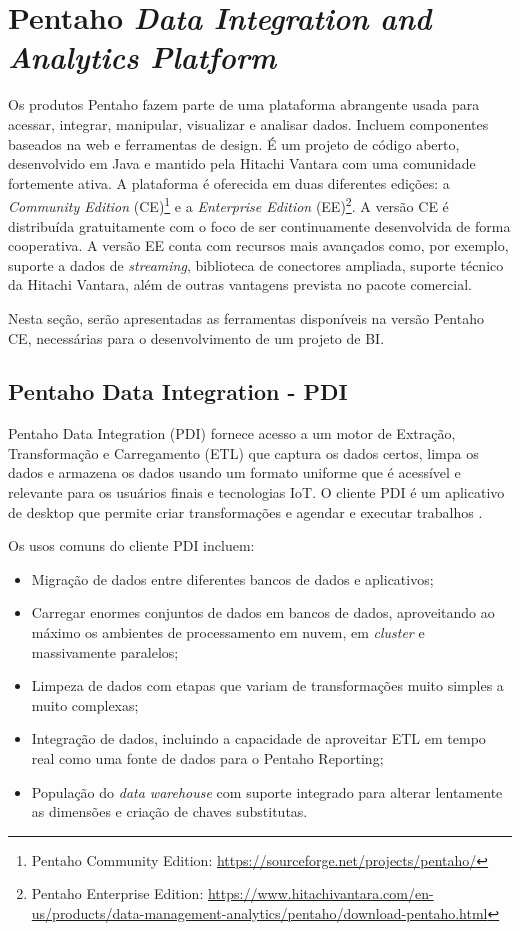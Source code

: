 \section{Pentaho \textit{Data Integration and Analytics Platform}}
Os produtos Pentaho fazem parte de uma plataforma abrangente usada para acessar, integrar, manipular, visualizar e analisar dados. Incluem componentes baseados na web e ferramentas de design. É um projeto de código aberto, desenvolvido em Java e mantido pela Hitachi Vantara com uma comunidade fortemente ativa. A plataforma é oferecida em duas diferentes edições: a \textit{Community Edition} (CE)\footnote{Pentaho Community Edition: \url{https://sourceforge.net/projects/pentaho/}} e a \textit{Enterprise Edition} (EE)\footnote{Pentaho Enterprise Edition: \url{https://www.hitachivantara.com/en-us/products/data-management-analytics/pentaho/download-pentaho.html}}. A versão CE é distribuída gratuitamente com o foco de ser continuamente desenvolvida de forma cooperativa. A versão EE conta com recursos mais avançados como, por exemplo, suporte a dados de \textit{streaming}, biblioteca de conectores ampliada, suporte técnico da Hitachi Vantara, além de outras vantagens prevista no pacote comercial. 

Nesta seção, serão apresentadas as ferramentas disponíveis na versão Pentaho CE, necessárias para o desenvolvimento de um projeto de BI.

\subsection{Pentaho Data Integration - PDI}
Pentaho Data Integration (PDI) fornece acesso a um motor de Extração, Transformação e Carregamento (ETL) que captura os dados certos, limpa os dados e armazena os dados usando um formato uniforme que é acessível e relevante para os usuários finais e tecnologias IoT. O cliente PDI é um aplicativo de desktop que permite criar transformações e agendar e executar trabalhos \cite{pentahodocumentation}.

Os usos comuns do cliente PDI incluem:
\begin{itemize}
    \item Migração de dados entre diferentes bancos de dados e aplicativos;
    \item Carregar enormes conjuntos de dados em bancos de dados, aproveitando ao máximo os ambientes de processamento em nuvem, em \textit{cluster} e massivamente paralelos;
    \item Limpeza de dados com etapas que variam de transformações muito simples a muito complexas;
    \item Integração de dados, incluindo a capacidade de aproveitar ETL em tempo real como uma fonte de dados para o Pentaho Reporting;
    \item População do \textit{data warehouse} com suporte integrado para alterar lentamente as dimensões e criação de chaves substitutas.
\end{itemize}

